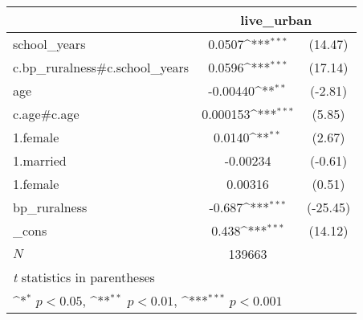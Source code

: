 {
\def\sym#1{\ifmmode^{#1}\else\(^{#1}\)\fi}
\begin{tabular}{l*{1}{cc}}
\hline\hline
            &\multicolumn{2}{c}{live\_urban}    \\
\hline
school\_years&      0.0507\sym{***}&     (14.47)\\
c.bp\_ruralness#c.school\_years&      0.0596\sym{***}&     (17.14)\\
age         &    -0.00440\sym{**} &     (-2.81)\\
c.age#c.age &    0.000153\sym{***}&      (5.85)\\
1.female    &      0.0140\sym{**} &      (2.67)\\
1.married   &    -0.00234         &     (-0.61)\\
1.female#1.married&     0.00316         &      (0.51)\\
bp\_ruralness&      -0.687\sym{***}&    (-25.45)\\
\_cons      &       0.438\sym{***}&     (14.12)\\
\hline
\(N\)       &      139663         &            \\
\hline\hline
\multicolumn{3}{l}{\footnotesize \textit{t} statistics in parentheses}\\
\multicolumn{3}{l}{\footnotesize \sym{*} \(p<0.05\), \sym{**} \(p<0.01\), \sym{***} \(p<0.001\)}\\
\end{tabular}
}
